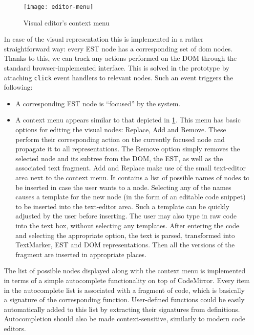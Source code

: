 \begin{figure}[h!]
\centering
\texttt{[image: editor-menu]}
\caption{Visual editor's context menu}
\label{fig:editor-menu}
\end{figure}

In case of the visual representation this is implemented in a rather straightforward way: every EST node has a corresponding set of \acrshort{dom} nodes. Thanks to this, we can track any actions performed on the DOM through the standard browser-implemented interface. This is solved in the prototype by attaching \texttt{click} event handlers to relevant nodes. Such an event triggers the following:
\begin{itemize}
    \item A corresponding EST node is ``focused'' by the system. 
    \item A context menu appears similar to that depicted in \ref{fig:editor-menu}. This menu has basic options for editing the visual nodes: Replace, Add and Remove. These perform their corresponding action on the currently focused node and propagate it to all representations. The Remove option simply removes the selected node and its subtree from the DOM, the EST, as well as the associated text fragment. Add and Replace make use of the small text-editor area next to the context menu. It contains a list of possible names of nodes to be inserted in case the user wants to  a node. Selecting any of the names causes a template for the new node (in the form of an editable code snippet) to be inserted into the text-editor area. Such a template can be quickly adjusted by the user before inserting. The user may also type in raw code into the text box, without selecting any templates. After entering the code and selecting the appropriate option, the text is parsed, transformed into TextMarker, EST and DOM representations. Then all the versions of the fragment are inserted in appropriate places.
\end{itemize}

The list of possible nodes displayed along with the context menu is implemented in terms of a simple autocomplete functionality on top of CodeMirror. Every item in the autocomplete list is associated with a fragment of code, which is basically a signature of the corresponding function. User-defined functions could be easily automatically added to this list by extracting their signatures from definitions. Autocompletion should also be made context-sensitive, similarly to modern code editors.

